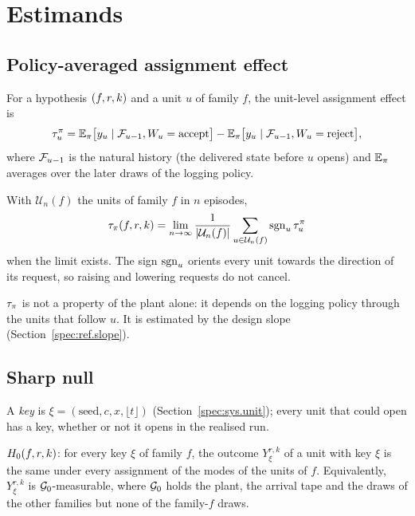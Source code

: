 \section{Estimands}
\label{spec:est}

\subsection{Policy-averaged assignment effect}
\label{spec:est.taupi}

For a hypothesis $(f, r, k)$ and a unit $u$ of family $f$, the unit-level assignment effect is
\begin{equation*}
\tau_u^{\pi} = \mathbb{E}_{\pi}\bigl[y_u \mid \mathcal{F}_{u-1}, W_u = \text{accept}\bigr]
             - \mathbb{E}_{\pi}\bigl[y_u \mid \mathcal{F}_{u-1}, W_u = \text{reject}\bigr],
\end{equation*}
where $\mathcal{F}_{u-1}$ is the natural history (the delivered state before $u$ opens) and $\mathbb{E}_\pi$ averages over the later draws of the logging policy.

\begin{definition}
With $\mathcal{U}_n(f)$ the units of family $f$ in $n$ episodes,
\begin{equation*}
\tau_{\pi}(f, r, k) = \lim_{n \to \infty} \frac{1}{\lvert \mathcal{U}_n(f)\rvert} \sum_{u \in \mathcal{U}_n(f)} \mathrm{sgn}_u\, \tau_u^{\pi}
\end{equation*}
when the limit exists. The sign $\mathrm{sgn}_u$ orients every unit towards the direction of its request, so raising and lowering requests do not cancel.
\end{definition}

\noindent $\tau_{\pi}$ is not a property of the plant alone: it depends on the logging policy through the units that follow $u$. It is estimated by the design slope (Section~\ref{spec:ref.slope}).

\subsection{Sharp null}
\label{spec:est.sharp}

A \emph{key} is $\xi = (\text{seed}, c, x, \lfloor t \rfloor)$ (Section~\ref{spec:sys.unit}); every unit that could open has a key, whether or not it opens in the realised run.

\begin{definition}
$H_0(f, r, k)$: for every key $\xi$ of family $f$, the outcome $Y_\xi^{r,k}$ of a unit with key $\xi$ is the same under every assignment of the modes of the units of $f$. Equivalently, $Y_\xi^{r,k}$ is $\mathcal{G}_{0}$-measurable, where $\mathcal{G}_{0}$ holds the plant, the arrival tape and the draws of the other families but none of the family-$f$ draws.
\end{definition}

